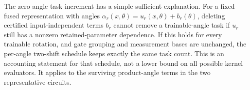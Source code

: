 The zero angle-task increment has a simple sufficient explanation.
For a fixed fused representation with angles
$\alpha_r(x,\theta)=u_r(x,\theta)+b_r(\theta)$, deleting certified
input-independent terms $b_r$ cannot remove a trainable-angle task
if $u_r$ still has a nonzero retained-parameter dependence. If this
holds for every trainable rotation, and gate grouping and measurement
bases are unchanged, the per-angle two-shift schedule keeps exactly
the same task count. This is an accounting statement for that schedule,
not a lower bound on all possible kernel evaluators. It applies to the
surviving product-angle terms in the two representative circuits.
